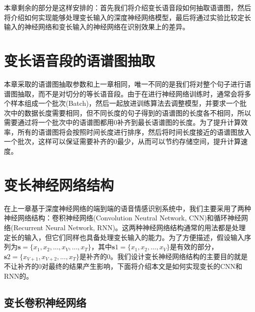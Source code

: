 本章剩余的部分是这样安排的：首先我们将介绍变长语音段如何抽取语谱图，然后将介绍如何实现能够处理变长输入的深度神经网络模型，最后将通过实验比较定长输入的神经网络和变长输入的神经网络在识别效果上的差异。

\section{变长语音段的语谱图抽取}

本章采取的语谱图抽取参数和上一章相同，唯一不同的是我们将对整个句子进行语谱图抽取，而不是对切分的等长语音段。由于在进行神经网络训练时，通常会将多个样本组成一个批次(Batch)，然后一起放进训练算法去调整模型，并要求一个批次中的数据长度需要相同，但不同长度的句子得到的语谱图的长度各不相同，所以需要通过将一个批次中的语谱图都用0补齐到最长语谱图的长度。为了提升计算效率，所有的语谱图将会按照时间长度进行排序，然后将时间长度接近的语谱图放入一个批次，这样可以保证需要补齐的0最少，从而可以节约存储空间，提升计算速度。

\section{变长神经网络结构}
\label{sec:var_len_nn}

在上一章基于深度神经网络的端到端的语音情感识别系统中，我们主要采用了两种神经网络结构：卷积神经网络(Convolution Neutral Network, CNN)和循环神经网络(Recurrent Neural Network, RNN)。这两种神经网络结构通常的用法都是处理定长的输入，但它们同样也具备处理变长输入的能力。为了方便描述，假设输入序列为$\mathbf{s} = \{x_1, x_2,...,x_V,...,x_T\}$，其中$\mathbf{s}1 = \{x_1, x_2,...,x_V\}$是有效的部分，$\mathbf{s}2 = \{x_{V+1}, x_{V+2},...,x_T\}$是补齐的0。我们设计变长神经网络结构的主要目的就是不让补齐的0对最终的结果产生影响，下面将介绍本文是如何实现变长的CNN和RNN的。

\subsection{变长卷积神经网络}
\label{ssec:var_len_cnn}

